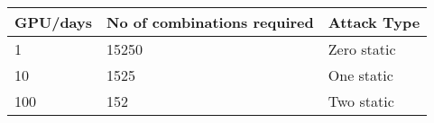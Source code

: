 \begin{tabular}{lll}
    GPU/days & No of combinations required & Attack Type \\
    \hline
    1       & 15250   & Zero static\\
    10      & 1525    & One static\\
    100     & 152     & Two static\\        
\end{tabular}